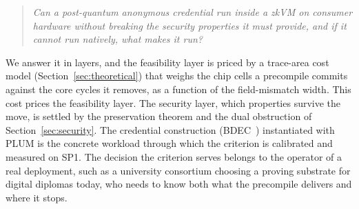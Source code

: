 \begin{quote}
\emph{Can a post-quantum anonymous credential run inside a zkVM on consumer hardware without breaking the security properties it must provide, and if it cannot run natively, what makes it run?}
\end{quote}

We answer it in layers, and the feasibility layer is priced by a trace-area cost model (Section~\ref{sec:theoretical}) that weighs the chip cells a precompile commits against the core cycles it removes, as a function of the field-mismatch width. This cost prices the feasibility layer. The security layer, which properties survive the move, is settled by the preservation theorem and the dual obstruction of Section~\ref{sec:security}. The credential construction (BDEC~\cite{10.1007/978-981-96-0957-4_3}) instantiated with PLUM is the concrete workload through which the criterion is calibrated and measured on SP1. The decision the criterion serves belongs to the operator of a real deployment, such as a university consortium choosing a proving substrate for digital diplomas today, who needs to know both what the precompile delivers and where it stops.


